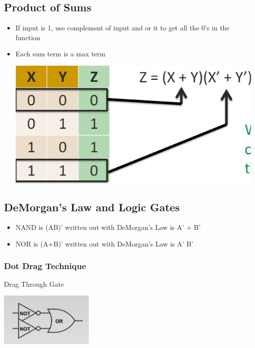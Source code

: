 \documentclass{article}
\begin{document}
\subsection{Product of Sums}

\begin{itemize}
    \item If input is 1, use complement of input and or it to get all the 0's in the function
    
    \item Each sum term is a max term
    
    \includegraphics[scale=0.35]{images/maxterms.png}
\end{itemize}


\subsection{DeMorgan's Law and Logic Gates}

\begin{itemize}
    \item NAND is (AB)' written out with DeMorgan's Law is A' + B'
 
    \item NOR is (A+B)' written out with DeMorgan's Law is A' B'
    
 \end{itemize}
 
   \subsubsection{Dot Drag Technique}
    
    Drag Through Gate
    
    \includegraphics[]{images/drag_gate_before.png}
    
\end{document}
